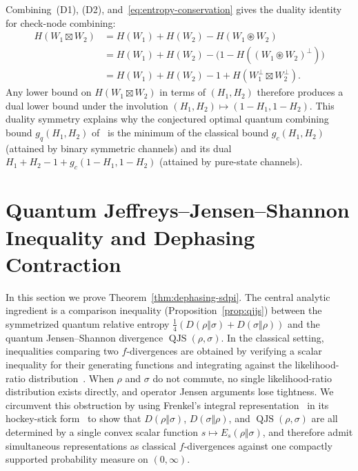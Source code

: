 \documentclass[10pt,a4paper]{article}
\numberwithin{equation}{section}
\theoremstyle{plain}
\theoremstyle{definition}
\theoremstyle{remark}
\DeclareMathOperator{\QJS}{QJS}
\begin{document}
Combining~(D1), (D2), and~\eqref{eq:entropy-conservation} gives the duality identity for check-node combining:
\begin{equation}\label{eq:duality-check}
\begin{aligned}
H(W_1 \boxtimes W_2) &= H(W_1) + H(W_2) - H(W_1 \circledast W_2)\\
&= H(W_1) + H(W_2) - \bigl(1 - H((W_1 \circledast W_2)^{\perp})\bigr)\\
&= H(W_1) + H(W_2) - 1 + H(W_1^{\perp} \boxtimes W_2^{\perp}).
\end{aligned}
\end{equation}
Any lower bound on $H(W_1 \boxtimes W_2)$ in terms of $(H_1, H_2)$ therefore produces a dual lower bound under the involution $(H_1, H_2) \mapsto (1 - H_1, 1 - H_2)$. This duality symmetry explains why the conjectured optimal quantum combining bound $g_q(H_1, H_2)$ of~\cite{HircheReeb2018} is the minimum of the classical bound $g_c(H_1, H_2)$ (attained by binary symmetric channels) and its dual $H_1 + H_2 - 1 + g_c(1 - H_1, 1 - H_2)$ (attained by pure-state channels).

\section{Quantum Jeffreys--Jensen--Shannon Inequality and Dephasing Contraction}\label{sec:qjjs-sdpi}

In this section we prove Theorem~\ref{thm:dephasing-sdpi}. The central analytic ingredient is a comparison inequality (Proposition~\ref{prop:qjjs}) between the symmetrized quantum relative entropy $\frac{1}{4}(D(\rho\Vert\sigma) + D(\sigma\Vert\rho))$ and the quantum Jensen--Shannon divergence $\QJS(\rho, \sigma)$. In the classical setting, inequalities comparing two $f$-divergences are obtained by verifying a scalar inequality for their generating functions and integrating against the likelihood-ratio distribution~\cite{SasonVerdu2016}. When $\rho$ and $\sigma$ do not commute, no single likelihood-ratio distribution exists directly, and operator Jensen arguments lose tightness. We circumvent this obstruction by using Frenkel's integral representation~\cite{Frenkel2023} in its hockey-stick form~\cite{HircheTomamichel2024} to show that $D(\rho\Vert\sigma)$, $D(\sigma\Vert\rho)$, and $\QJS(\rho, \sigma)$ are all determined by a single convex scalar function $s \mapsto E_s(\rho\Vert\sigma)$, and therefore admit simultaneous representations as classical $f$-divergences against one compactly supported probability measure on $(0,\infty)$.
\end{document}
